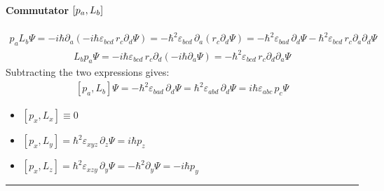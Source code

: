 \documentclass[letterpaper,10pt,english]{jupyterBook}
\begin{document}
\paragraph{Commutator \protect\([p_a, L_b]\protect\)}
\label{\detokenize{ch/quantum-mechanics/atom-models/schrodinger-notes:commutator-p-a-l-b}}\begin{equation*}
\begin{split}p_a L_b \Psi = -i\hbar \partial_a \left(-i\hbar \varepsilon_{bcd} \, r_c \partial_d \Psi\right) = -\hbar^2 \varepsilon_{bcd} \, \partial_a (r_c \partial_d \Psi) = -\hbar^2 \varepsilon_{bad} \, \partial_d \Psi - \hbar^2 \varepsilon_{bcd} \, r_c \partial_a \partial_d \Psi\end{split}
\end{equation*}\begin{equation*}
\begin{split}L_b p_a \Psi = -i\hbar \varepsilon_{bcd} \, r_c \partial_d (-i\hbar \partial_a \Psi) = -\hbar^2 \varepsilon_{bcd} \, r_c \partial_d \partial_a \Psi\end{split}
\end{equation*}
\sphinxAtStartPar
Subtracting the two expressions gives:
\begin{equation*}
\begin{split}[p_a, L_b] \Psi = -\hbar^2 \varepsilon_{bad} \, \partial_d \Psi = \hbar^2 \varepsilon_{abd} \, \partial_d \Psi = i\hbar \varepsilon_{abc} \, p_c \Psi\end{split}
\end{equation*}
\sphinxAtStartPar
{}
\begin{itemize}
\item {} 
\sphinxAtStartPar
\([p_x, L_x] \equiv 0\)

\item {} 
\sphinxAtStartPar
\([p_x, L_y] = \hbar^2 \varepsilon_{xyz} \, \partial_z \Psi = i\hbar p_z\)

\item {} 
\sphinxAtStartPar
\([p_x, L_z] = \hbar^2 \varepsilon_{xzy} \, \partial_y \Psi = -\hbar^2 \partial_y \Psi = -i\hbar p_y\)

\end{itemize}


\bigskip\hrule\bigskip
\end{document}
